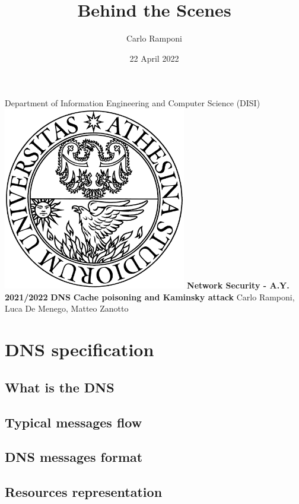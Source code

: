 \documentclass[11pt,a4paper]{article}
\title{Behind the Scenes}
\author{Carlo Ramponi}
\date{22 April 2022}
\begin{document}
\begin{titlepage}

\centering
    \vfill
    \vskip3cm
    \Large Department of Information Engineering and Computer Science
    \vskip0.5cm
    \Large (DISI)
    \vskip2cm
    \includegraphics[width=8cm]{images/logo_unitn.png}
    \vskip2cm
    \textbf{\Large Network Security - A.Y. 2021/2022}
    \vskip2cm
    \textbf{\LARGE DNS}
    \vskip0.2cm
    \textbf{\LARGE Cache poisoning and Kaminsky attack}
    \vskip4cm
    \Large Carlo Ramponi, Luca De Menego, Matteo Zanotto
    \vfill

\end{titlepage}

\clearpage

\tableofcontents

\clearpage

\section{DNS specification}

\subsection{What is the DNS}

\subsection{Typical messages flow}

\subsection{DNS messages format}

\subsection{Resources representation}
\end{document}

